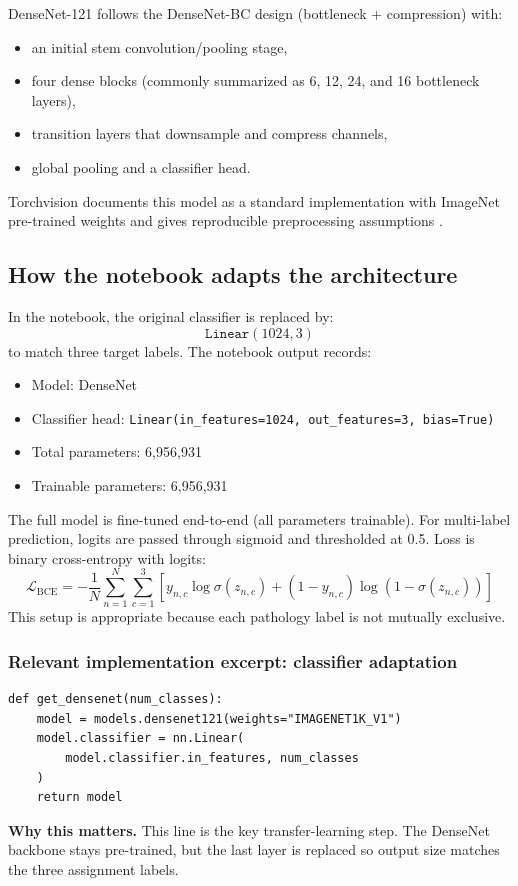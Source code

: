 \documentclass[12pt]{article}
\begin{document}
DenseNet-121 follows the DenseNet-BC design (bottleneck + compression) with:
\begin{itemize}
    \item an initial stem convolution/pooling stage,
    \item four dense blocks (commonly summarized as 6, 12, 24, and 16 bottleneck layers),
    \item transition layers that downsample and compress channels,
    \item global pooling and a classifier head.
\end{itemize}
Torchvision documents this model as a standard implementation with ImageNet pre-trained weights and gives reproducible preprocessing assumptions \citep{torchvision_densenet121}.

\subsection{How the notebook adapts the architecture}
In the notebook, the original classifier is replaced by:
\[
\texttt{Linear}(1024, 3)
\]
to match three target labels. The notebook output records:
\begin{itemize}
    \item Model: DenseNet
    \item Classifier head: \texttt{Linear(in\_features=1024, out\_features=3, bias=True)}
    \item Total parameters: 6,956,931
    \item Trainable parameters: 6,956,931
\end{itemize}

The full model is fine-tuned end-to-end (all parameters trainable). For multi-label prediction, logits are passed through sigmoid and thresholded at 0.5. Loss is binary cross-entropy with logits:
\[
\mathcal{L}_{\text{BCE}} = -\frac{1}{N}\sum_{n=1}^{N}\sum_{c=1}^{3}
\left[y_{n,c}\log\sigma(z_{n,c}) + (1-y_{n,c})\log(1-\sigma(z_{n,c}))\right]
\]
This setup is appropriate because each pathology label is not mutually exclusive.

\subsubsection*{Relevant implementation excerpt: classifier adaptation}
\begin{verbatim}
def get_densenet(num_classes):
    model = models.densenet121(weights="IMAGENET1K_V1")
    model.classifier = nn.Linear(
        model.classifier.in_features, num_classes
    )
    return model
\end{verbatim}
\textbf{Why this matters.} This line is the key transfer-learning step. The DenseNet backbone stays pre-trained, but the last layer is replaced so output size matches the three assignment labels.
\end{document}
